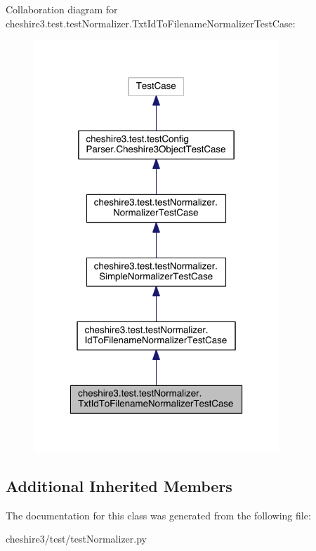 Collaboration diagram for cheshire3.\-test.\-test\-Normalizer.\-Txt\-Id\-To\-Filename\-Normalizer\-Test\-Case\-:
\nopagebreak
\begin{figure}[H]
\begin{center}
\leavevmode
\includegraphics[width=262pt]{classcheshire3_1_1test_1_1test_normalizer_1_1_txt_id_to_filename_normalizer_test_case__coll__graph}
\end{center}
\end{figure}
\subsection*{Additional Inherited Members}


The documentation for this class was generated from the following file\-:\begin{DoxyCompactItemize}
\item 
cheshire3/test/test\-Normalizer.\-py\end{DoxyCompactItemize}
